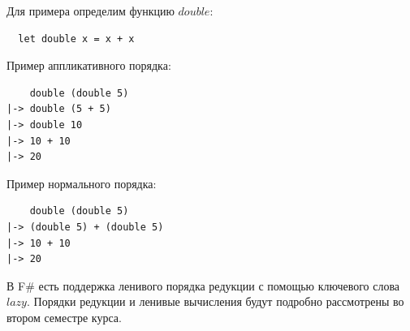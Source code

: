 \documentclass[a4paper,11pt]{article}
\begin{document}
Для примера определим функцию $double$:
\begin{lstlisting}
  let double x = x + x
\end{lstlisting}

Пример аппликативного порядка:
\begin{lstlisting}
    double (double 5)
|-> double (5 + 5)
|-> double 10
|-> 10 + 10
|-> 20
\end{lstlisting}

Пример нормального порядка:
\begin{lstlisting}
    double (double 5)
|-> (double 5) + (double 5)
|-> 10 + 10
|-> 20
\end{lstlisting}

В F\# есть поддержка ленивого порядка редукции с помощью ключевого слова $lazy$.
Порядки редукции и ленивые вычисления будут подробно рассмотрены во втором
семестре курса.

\nocite{*}


\end{document}
